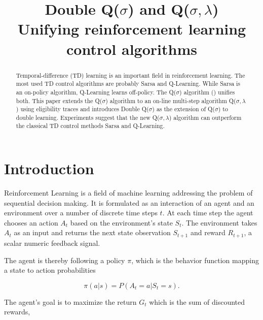 \documentclass{article} %
\title{Double Q($\sigma$) and Q($\sigma, \lambda$) \\ Unifying reinforcement learning control algorithms}
\begin{document}
\thispagestyle{empty}
\maketitle

\begin{abstract}
Temporal-difference (TD) learning is an important field in reinforcement learning. The most used TD control algorithms are probably Sarsa and Q-Learning. While Sarsa is an on-policy algorithm, Q-Learning learns off-policy. The Q($\sigma$) algorithm (\cite{sutton2017}) unifies both.
This paper extends the Q($\sigma$) algorithm to an on-line multi-step algorithm Q($\sigma, \lambda$) using eligibility traces and introduces Double Q($\sigma$) as the extension of Q($\sigma$) to double learning. 
Experiments suggest that the new Q($\sigma, \lambda$) algorithm can outperform the classical TD control methods Sarsa and Q-Learning.
\end{abstract}

\section{Introduction}

Reinforcement Learning is a field of machine learning addressing the problem of sequential decision making. It is formulated as an interaction of an agent and an environment over a number of discrete time steps $t$. At each time step the agent chooses an action $A_t$ based on the environment's state $S_t$. The environment takes $A_t$ as an input and returns the next state observation $S_{t+1}$ and reward $R_{t+1}$, a scalar numeric feedback signal.

The agent is thereby following a policy $\pi$, which is the behavior function mapping a state to action probabilities

\begin{equation} 
\pi(a | s) = P(A_t = a | S_t = s).
\end{equation}


The agent's goal is to maximize the return $G_t$ which is the sum of discounted rewards,
\end{document}
